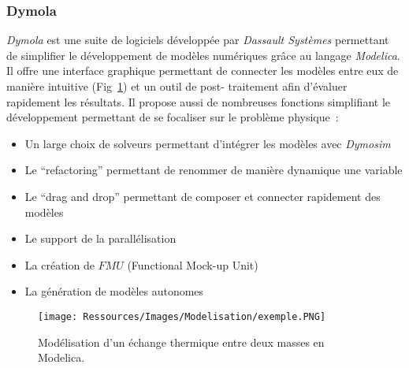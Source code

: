 \subsubsection{Dymola} %
\label{ssub:dymola}
\emph{Dymola} est une suite de logiciels développée par \emph{Dassault Systèmes}
permettant de simplifier le développement de modèles numériques grâce au langage
\emph{Modelica}. Il offre une interface graphique permettant de connecter les modèles
entre eux de manière intuitive (Fig~\ref{fig:exemple_modelica}) et un outil de post-
traitement afin d’évaluer rapidement les résultats. Il propose aussi de nombreuses fonctions
simplifiant le développement permettant de se focaliser sur le problème physique~:
\begin{itemize}
    \item Un large choix de solveurs permettant d’intégrer les modèles avec \emph{Dymosim}
    \item Le \enquote{refactoring} permettant de renommer de manière dynamique une variable
    \item Le \enquote{drag and drop} permettant de composer et connecter rapidement des modèles
    \item Le support de la parallélisation
    \item La création de $FMU$ (Functional Mock-up Unit)
    \item La génération de modèles autonomes
\end{itemize}

\begin{figure}
    \begin{center}
        \texttt{[image: Ressources/Images/Modelisation/exemple.PNG]}
    \end{center}
    \caption{Modélisation d’un échange thermique entre deux masses en Modelica.
             \label{fig:exemple_modelica}}
\end{figure}


